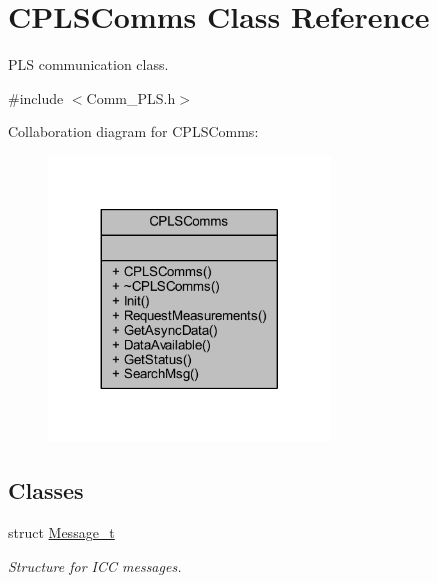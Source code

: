 \hypertarget{class_c_p_l_s_comms}{}\section{C\+P\+L\+S\+Comms Class Reference}
\label{class_c_p_l_s_comms}


P\+LS communication class.  




{\ttfamily \#include $<$Comm\+\_\+\+P\+L\+S.\+h$>$}



Collaboration diagram for C\+P\+L\+S\+Comms\+:
\nopagebreak
\begin{figure}[H]
\begin{center}
\leavevmode
\includegraphics[width=212pt]{class_c_p_l_s_comms__coll__graph}
\end{center}
\end{figure}
\subsection*{Classes}
\begin{DoxyCompactItemize}
\item 
struct \mbox{\hyperlink{struct_c_p_l_s_comms_1_1_message__t}{Message\+\_\+t}}
\begin{DoxyCompactList}\small\item\em Structure for I\+CC messages. \end{DoxyCompactList}\end{DoxyCompactItemize}
